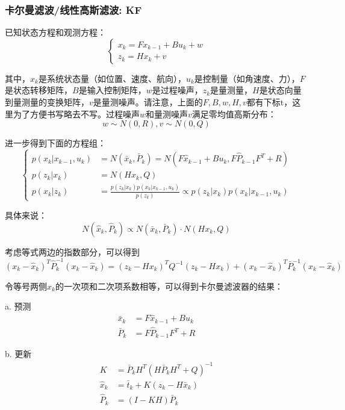 \subsubsection{卡尔曼滤波/线性高斯滤波: KF}
已知状态方程和观测方程：
\begin{equation}
	\left\{
	\begin{array}{lr}
		x_k = F x_{k-1} + B u_k + w \\
		z_k = H x_k + v
	\end{array}
	\right.
\end{equation}
\par 其中，$x_k$是系统状态量（如位置、速度、航向），$u_k$是控制量（如角速度、力），$F$是状态转移矩阵，$B$是输入控制矩阵，$w$是过程噪声，$z_k$是量测量，$H$是状态向量到量测量的变换矩阵，$v$是量测噪声。请注意，上面的$F,B,w,H,v$都有下标t，这里为了方便书写略去不写。过程噪声$w$和量测噪声$v$满足零均值高斯分布：
\begin{equation}
	w \sim N(0,R),v \sim N(0,Q)
\end{equation}
\par 进一步得到下面的方程组：
\begin{equation}
	\left\{
	\begin{split}
		p(x_k|x_{k-1},u_k)
		&=N(\bar{x}_k,\bar{P}_k)
		=N(F \hat{x}_{k-1} + B u_k, F \hat{P}_{k-1} F^T + R) \\
		p(z_k|x_k) &=N(H x_k,Q) \\
		p(x_k|z_k) &= \frac{p(z_k|x_k)p(x_k|x_{k-1},u_k)}{p(z_k)} \propto p(z_k|x_k)p(x_k|x_{k-1},u_k)
	\end{split}
	\right.
\end{equation}
\par 具体来说：
\begin{equation}
	N(\hat{x}_k,\hat{P}_k) \propto N(\bar{x}_k,\bar{P}_k) \cdot N(H x_k,Q)
\end{equation}
\par 考虑等式两边的指数部分，可以得到
\begin{equation}
	(x_k-\hat{x}_k)^T\hat{P}_k^{-1}(x_k-\hat{x}_k)
	=
	(z_k-H x_k)^T Q^{-1} (z_k-H x_k)
	+
	(x_k-\hat{x}_k)^T \bar{P}_k^{-1} (x_k-\hat{x}_k)
\end{equation}
\par 令等号两侧$x_k$的一次项和二次项系数相等，可以得到卡尔曼滤波器的结果：
\par a. 预测
\begin{equation}
	\begin{split}
		\bar{x}_k&=F\hat{x}_{k-1} + B u_k \\
		\bar{P}_k&=F\hat{P}_{k-1}F^T+R
	\end{split}
\end{equation}
\par b. 更新
\begin{equation}
	\begin{split}
		K&=\bar{P}_k H^T(H \bar{P}_k H^T + Q)^{-1} \\
		\hat{x}_k&=\bar{t}_k+K(z_k-H \bar{x}_k) \\
		\hat{P}_k&=(I-K H)\bar{P}_k
	\end{split}
\end{equation}


